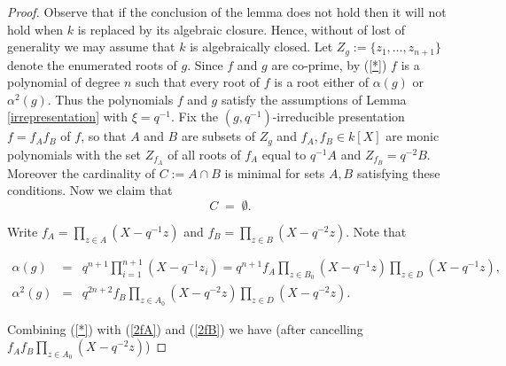 \documentclass[a4paper, 11pt]{article}
\theoremstyle{definition}
\begin{document}
\begin{proof}
Observe that if the conclusion of the lemma does not hold then it will not hold when $k$ is replaced by its algebraic closure. Hence, without of lost of  generality we may assume that $k$ is algebraically closed. Let  $Z_g:=\{z_1,\ldots, z_{n+1}\}$ denote the enumerated roots of $g$.  Since $f$ and $g$ are co-prime, by (\ref{*}) $f$ is a polynomial of degree $n$ such that every root of $f$ is a root either of $\alpha(g) $ or $\alpha^2(g) $. Thus the polynomials $f$ and $g$ satisfy the assumptions of Lemma \ref{irrepresentation} with $\xi=q^{-1}$. Fix the $(g,q^{-1})$-irreducible presentation $f=f_Af_B$ of $f$, so that $A$ and $B$ are  subsets of  $Z_g$ and  $f_A, f_B\in k[X]$ are monic polynomials  with the set $Z_{f_A}$ of all roots of  $f_A$ equal to $q^{-1}A$ and $Z_{f_B}=q^{-2}B$. Moreover the cardinality of  $C:=A\cap B$ is minimal for sets $A,B$ satisfying these conditions. Now we claim that 
\begin{equation}\label{Cempty} C\; =\; \emptyset.
\end{equation}

Write  $f_A=\prod_{z\in A}(X-q^{-1}z)$ and $f_B=\prod_{z\in B}(X-q^{-2}z)$. Note that

\begin{eqnarray}
\alpha(g) &=& q^{n+1}\prod_{i=1}^{n+1}(X-q^{-1}z_i)=q^{n+1}f_A\prod_{z\in B_0}(X-q^{-1}z)\prod_{z\in D}(X-q^{-1}z)\label{2fA},\\
\alpha^2(g) &=& q^{2n+2}f_B\prod_{z\in A_0}(X-q^{-2}z)\prod_{z\in D}(X-q^{-2}z).\label{2fB}
\end{eqnarray}

\noindent Combining (\ref{*}) with (\ref{2fA}) and (\ref{2fB}) we have (after cancelling $f_Af_B\prod_{z\in A_0}(X - q^{-2}z)$)



\end{proof}
\end{document}
